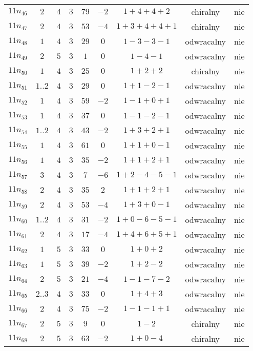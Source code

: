 \begin{longtable}{ccccccccc}
$11n_{46}$ & $2$ & $4$ & $3$ & $79$ & $-2$ & $1+4+4+2$ & chiralny & nie \\
$11n_{47}$ & $2$ & $4$ & $3$ & $53$ & $-4$ & $1+3+4+4+1$ & chiralny & nie \\
$11n_{48}$ & $1$ & $4$ & $3$ & $29$ & $0$ & $1-3-3-1$ & odwracalny & nie \\
$11n_{49}$ & $2$ & $5$ & $3$ & $1$ & $0$ & $1-4-1$ & odwracalny & nie \\
$11n_{50}$ & $1$ & $4$ & $3$ & $25$ & $0$ & $1+2+2$ & chiralny & nie \\
$11n_{51}$ & $1..2$ & $4$ & $3$ & $29$ & $0$ & $1+1-2-1$ & odwracalny & nie \\
$11n_{52}$ & $1$ & $4$ & $3$ & $59$ & $-2$ & $1-1+0+1$ & odwracalny & nie \\
$11n_{53}$ & $1$ & $4$ & $3$ & $37$ & $0$ & $1-1-2-1$ & odwracalny & nie \\
$11n_{54}$ & $1..2$ & $4$ & $3$ & $43$ & $-2$ & $1+3+2+1$ & odwracalny & nie \\
$11n_{55}$ & $1$ & $4$ & $3$ & $61$ & $0$ & $1+1+0-1$ & odwracalny & nie \\
$11n_{56}$ & $1$ & $4$ & $3$ & $35$ & $-2$ & $1+1+2+1$ & odwracalny & nie \\
$11n_{57}$ & $3$ & $4$ & $3$ & $7$ & $-6$ & $1+2-4-5-1$ & odwracalny & nie \\
$11n_{58}$ & $2$ & $4$ & $3$ & $35$ & $2$ & $1+1+2+1$ & odwracalny & nie \\
$11n_{59}$ & $2$ & $4$ & $3$ & $53$ & $-4$ & $1+3+0-1$ & odwracalny & nie \\
$11n_{60}$ & $1..2$ & $4$ & $3$ & $31$ & $-2$ & $1+0-6-5-1$ & odwracalny & nie \\
$11n_{61}$ & $2$ & $4$ & $3$ & $17$ & $-4$ & $1+4+6+5+1$ & odwracalny & nie \\
$11n_{62}$ & $1$ & $5$ & $3$ & $33$ & $0$ & $1+0+2$ & odwracalny & nie \\
$11n_{63}$ & $1$ & $5$ & $3$ & $39$ & $-2$ & $1+2-2$ & odwracalny & nie \\
$11n_{64}$ & $2$ & $5$ & $3$ & $21$ & $-4$ & $1-1-7-2$ & odwracalny & nie \\
$11n_{65}$ & $2..3$ & $4$ & $3$ & $33$ & $0$ & $1+4+3$ & odwracalny & nie \\
$11n_{66}$ & $2$ & $4$ & $3$ & $75$ & $-2$ & $1-1-1+1$ & odwracalny & nie \\
$11n_{67}$ & $2$ & $5$ & $3$ & $9$ & $0$ & $1-2$ & chiralny & nie \\
$11n_{68}$ & $2$ & $5$ & $3$ & $63$ & $-2$ & $1+0-4$ & chiralny & nie \\

\end{longtable}

